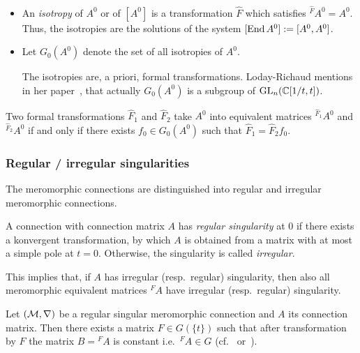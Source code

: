 \begin{defn}
  \begin{itemize}
    \item An \emph{isotropy} of $A^0$ or of $[A^0]$ is a transformation
      $\hat F$ which satisfies ${}^{\hat F}\!A^0=A^0$.
      Thus, the isotropies are the solutions of the system
      $[\operatorname{End} A^0]:=[A^0,A^0]$.
    \item Let $G_0(A^0)$ denote the set of all isotropies of $A^0$.
      \begin{s-rem}
        The isotropies are, a priori, formal transformations.
        Loday-Richaud mentions in her paper~\cite[853]{Loday1994}, that
        actually $G_0(A^0)$ is a subgroup of $\operatorname{GL}_n(\mathbb{C}[1/t,t])$.
      \end{s-rem}
  \end{itemize}
\end{defn}
\begin{lem}
  Two formal transformations $\hat F_1$ and $\hat F_2$ take $A^0$ into
  equivalent matrices ${}^{\hat F_1}\!A^0$ and  ${}^{\hat F_2}\!A^0$ if and
  only if there exists $f_0\in G_0(A^0)$ such that $\hat F_1=\hat F_2f_0$.
\end{lem}
\begin{comment}
  \begin{proof}
    \TODO[Look at \cite{BJL1979Birkhoff}?]
  \end{proof}
\end{comment}

\subsubsection{Regular / irregular singularities}
The meromorphic connections are distinguished into regular and irregular
meromorphic connections.
\begin{defn}
  A connection with connection matrix $A$ has \emph{regular singularity} at $0$
  if there exists a konvergent transformation, by which $A$ is obtained from a
  matrix with at most a simple pole at $t=0$.
  Otherwise, the singularity is called \emph{irregular}.
  \begin{s-rem}
    This implies that, if $A$ has irregular (resp.\ regular) singularity, then
    also all meromorphic equivalent matrices ${}^{F}\!A$ have irregular
    (resp.\ regular) singularity.
  \end{s-rem}
\end{defn}
\begin{thm}
  Let $(\mathcal{M},\nabla)$ be a regular singular meromorphic connection and $A$ its
  connection matrix.
  Then there exists a matrix $F\in G(\!\{t\}\!)$ such that after transformation
  by $F$ the matrix $B={}^F\!A$ is constant i.e.\ ${}^F\!A\in G$
  (cf.~\cite[Thm.II.2.8]{sabbah2007isomonodromic}
  or~\cite[Sec.5.1.2]{hotta2008}).
\end{thm}

